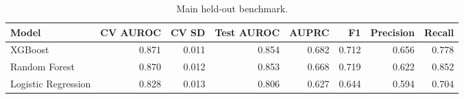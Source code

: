 \begin{table}[htbp]
\centering
\caption{Main held-out benchmark.}
\label{tab:main_benchmark_recomputed}
\begin{tabular}{lrrrrrrr}
\toprule
Model & CV AUROC & CV SD & Test AUROC & AUPRC & F1 & Precision & Recall \\
\midrule
XGBoost & 0.871 & 0.011 & 0.854 & 0.682 & 0.712 & 0.656 & 0.778 \\
Random Forest & 0.870 & 0.012 & 0.853 & 0.668 & 0.719 & 0.622 & 0.852 \\
Logistic Regression & 0.828 & 0.013 & 0.806 & 0.627 & 0.644 & 0.594 & 0.704 \\
\bottomrule
\end{tabular}

\end{table}
